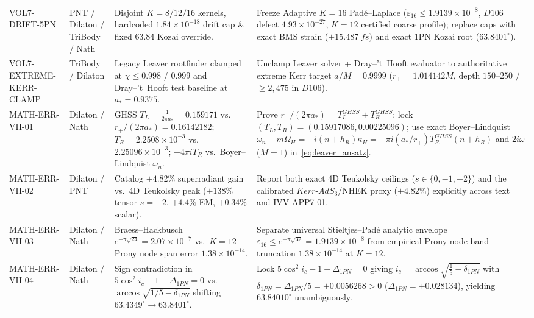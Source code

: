\documentclass[11pt,a4paper,reqno]{article}
\def\texttt#1{#1}%
\def\mathrm#1{#1}%
\def\mathbb#1{#1}%
\def\Done{D106}%
\theoremstyle{plain}
\theoremstyle{definition}
\theoremstyle{remark}
\numberwithin{equation}{section}
\numberwithin{table}{section}
\newcommand{\Done}{\mathbb{D}_{106}}
\begin{document}
\begin{longtable}{@{} P{2.65cm} P{2.45cm} P{4.10cm} P{\dimexpr\textwidth-9.2cm-6\tabcolsep\relax} @{}}
\texttt{VOL7-DRIFT-5PN} & PNT / Dilaton / TriBody / Nath & Disjoint $K=8/12/16$ kernels, hardcoded $1.84\times 10^{-18}$ drift cap \& fixed \texttt{63.84} Kozai override. & Freeze Adaptive $K=16$ Pad\'e--Laplace ($\varepsilon_{16} \le 1.9139\times 10^{-8}$, $\Done$ defect $4.93\times 10^{-27}$, $K=12$ certified coarse profile); replace caps with exact BMS strain ($+15.487\;\mathrm{fs}$) and exact 1PN Kozai root ($63.8401^\circ$). \\
\texttt{VOL7-EXTREME-\allowbreak KERR-CLAMP} & TriBody / Dilaton & Legacy Leaver rootfinder clamped at $\chi \le 0.998$ / $0.999$ and Dray--'t~Hooft test baseline at $a_* = 0.9375$. & Unclamp Leaver solver + Dray--'t~Hooft evaluator to authoritative extreme Kerr target $a/M = \mathbf{0.9999}$ ($r_+ = 1.014142M$, depth $150\text{--}250$ / $\ge 2{,}475$ in $\Done$). \\
\texttt{MATH-ERR-VII-01} & Dilaton / Nath & GHSS $T_L = \frac{1}{2\pi a_*} = 0.159171$ vs.\ $r_+/(2\pi a_*) = 0.16142182$; $T_R = 2.2508\times 10^{-3}$ vs.\ $2.25096\times 10^{-3}$; $-4\pi i T_R$ vs.\ Boyer--Lindquist $\omega_n$. & Prove $r_+/(2\pi a_*) = T_L^{\mathrm{GHSS}} + T_R^{\mathrm{GHSS}}$; lock $(T_L, T_R) = (0.15917086, 0.00225096)$; use exact Boyer--Lindquist $\omega_n - m\Omega_H = -i(n+h_R)\kappa_H = -\pi i(a_*/r_+)T_R^{\mathrm{GHSS}}(n+h_R)$ and $2i\omega$ ($M=1$) in~\eqref{eq:leaver_ansatz}. \\
\texttt{MATH-ERR-VII-02} & Dilaton / PNT & Catalog $+4.82\%$ superradiant gain vs.\ 4D Teukolsky peak ($+138\%$ tensor $s=-2$, $+4.4\%$ EM, $+0.34\%$ scalar). & Report both exact 4D Teukolsky ceilings ($s \in \{0,-1,-2\}$) and the calibrated $\mathrm{Kerr\text{-}AdS}_3$/NHEK proxy ($+4.82\%$) explicitly across text and \texttt{IVV-APP7-01}. \\
\texttt{MATH-ERR-VII-03} & Dilaton / Nath & Braess--Hackbusch $e^{-\pi\sqrt{24}} = 2.07\times 10^{-7}$ vs.\ $K=12$ Prony node span error $1.38\times 10^{-14}$. & Separate universal Stieltjes--Pad\'e analytic envelope $\varepsilon_{16} \le e^{-\pi\sqrt{32}} = 1.9139\times 10^{-8}$ from empirical Prony node-band truncation $1.38\times 10^{-14}$ at $K=12$. \\
\texttt{MATH-ERR-VII-04} & Dilaton / Nath & Sign contradiction in $5\cos^2 i_c - 1 - \Delta_{1\mathrm{PN}} = 0$ vs.\ $\arccos\sqrt{1/5 - \delta_{1\mathrm{PN}}}$ shifting $63.4349^\circ \to 63.8401^\circ$. & Lock $5\cos^2 i_c - 1 + \Delta_{1\mathrm{PN}} = 0$ giving $i_c = \arccos\sqrt{\frac{1}{5} - \delta_{1\mathrm{PN}}}$ with $\delta_{1\mathrm{PN}} = \Delta_{1\mathrm{PN}}/5 = +0.0056268 > 0$ ($\Delta_{1\mathrm{PN}} = +0.028134$), yielding $63.84010^\circ$ unambiguously. \\

\end{longtable}
\end{document}
